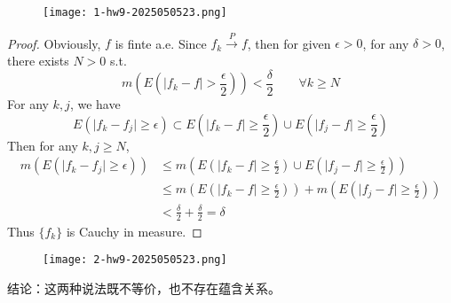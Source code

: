 \begin{exercise}
\begin{figure}[H]
\centering
\texttt{[image: 1-hw9-2025050523.png]}
\label{}
\end{figure}
\end{exercise}
\begin{proof}
Obviously, $f$ is finte a.e. Since $f_k\overset{ P }{ \to }f$, then for given $\epsilon>0$, for any $\delta>0$, there exists $N>0$ s.t.
\[
m\left( E\left( \lvert f_k-f \rvert >\frac{\epsilon}{2} \right) \right)<\frac{\delta}{2}\qquad \forall k\geq N
\]
For any $k,j$, we have
\[
E(\lvert f_k-f_j \rvert \geq \epsilon)\subset E\left( \lvert f_k-f \rvert \geq \frac{\epsilon}{2} \right)\cup E\left( \lvert f_j-f \rvert \geq \frac{\epsilon}{2} \right)
\]
Then for any $k,j\geq N$,
\[
\begin{aligned}
m(E(\lvert f_k-f_j \rvert \geq \epsilon)) & \leq m\left( E\left( \lvert f_k-f \rvert \geq \frac{\epsilon}{2} \right)\cup E\left( \lvert f_j-f \rvert \geq \frac{\epsilon}{2} \right) \right) \\
 & \leq m\left( E\left( \lvert f_k-f \rvert \geq \frac{\epsilon}{2} \right) \right)+m\left( E\left( \lvert f_j-f \rvert \geq \frac{\epsilon}{2} \right) \right) \\
 & <\frac{\delta}{2}+\frac{\delta}{2}=\delta
\end{aligned}
\]
Thus $\{ f_k \}$ is Cauchy in measure.
\end{proof}

\begin{exercise}
\begin{figure}[H]
\centering
\texttt{[image: 2-hw9-2025050523.png]}
\label{}
\end{figure}
\end{exercise}
结论：这两种说法既不等价，也不存在蕴含关系。

